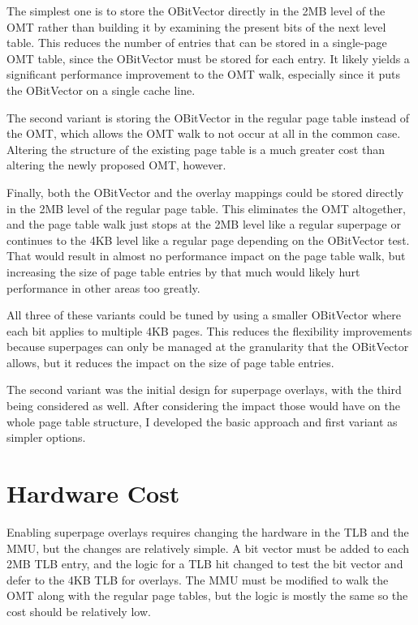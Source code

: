 The simplest one is to store the OBitVector directly in the 2MB level of the OMT rather than building it by examining the present bits of the next level table. This reduces the number of entries that can be stored in a single-page OMT table, since the OBitVector must be stored for each entry. It likely yields a significant performance improvement to the OMT walk, especially since it puts the OBitVector on a single cache line.

The second variant is storing the OBitVector in the regular page table instead of the OMT, which allows the OMT walk to not occur at all in the common case. Altering the structure of the existing page table is a much greater cost than altering the newly proposed OMT, however.

Finally, both the OBitVector and the overlay mappings could be stored directly in the 2MB level of the regular page table. This eliminates the OMT altogether, and the page table walk just stops at the 2MB level like a regular superpage or continues to the 4KB level like a regular page depending on the OBitVector test. That would result in almost no performance impact on the page table walk, but increasing the size of page table entries by that much would likely hurt performance in other areas too greatly.

All three of these variants could be tuned by using a smaller OBitVector where each bit applies to multiple 4KB pages. This reduces the flexibility improvements because superpages can only be managed at the granularity that the OBitVector allows, but it reduces the impact on the size of page table entries.

The second variant was the initial design for superpage overlays, with the third being considered as well. After considering the impact those would have on the whole page table structure, I developed the basic approach and first variant as simpler options.

\section{Hardware Cost}
Enabling superpage overlays requires changing the hardware in the TLB and the MMU, but the changes are relatively simple. A bit vector must be added to each 2MB TLB entry, and the logic for a TLB hit changed to test the bit vector and defer to the 4KB TLB for overlays. The MMU must be modified to walk the OMT along with the regular page tables, but the logic is mostly the same so the cost should be relatively low.

